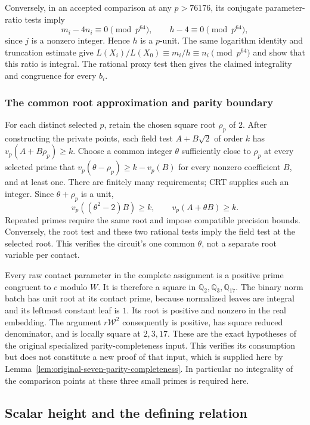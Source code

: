 \documentclass[11pt]{article}
\theoremstyle{definition}
\theoremstyle{remark}
\begin{document}
Conversely, in an accepted comparison at any $p>76176$, its conjugate
parameter-ratio tests imply
\[
 m_i-4n_i\equiv0\pmod{p^{64}},\qquad h-4\equiv0\pmod{p^{64}},
\]
since $j$ is a nonzero integer. Hence $h$ is a $p$-unit. The same
logarithm identity and truncation estimate give
$L(X_i)/L(X_0)\equiv m_i/h\equiv n_i\pmod{p^{64}}$ and show
that this ratio is integral. The rational proxy test then gives the
claimed integrality and congruence for every $b_i$.

\subsubsection{The common root approximation and parity boundary}\label{subsec:o8-root-proof}
For each distinct selected $p$, retain the chosen square root
$\rho_p$ of $2$. After constructing the private points, each field
test $A+B\sqrt2$ of order $k$ has $v_p(A+B\rho_p)\ge k$.
Choose a common integer $\theta$ sufficiently close to $\rho_p$ at
every selected prime that
$v_p(\theta-\rho_p)\ge k-v_p(B)$ for every nonzero coefficient $B$,
and at least one. There are finitely many requirements; CRT supplies
such an integer. Since $\theta+\rho_p$ is a unit,
\[
 v_p((\theta^2-2)B)\ge k,\qquad v_p(A+\theta B)\ge k.
\]
Repeated primes require the same root and impose compatible precision
bounds. Conversely, the root test and these two rational tests imply
the field test at the selected root. This verifies the circuit's one
common $\theta$, not a separate root variable per contact.

Every raw contact parameter in the complete assignment is a positive
prime congruent to $c$ modulo $W$. It is therefore a square in
$\mathbb Q_2,\mathbb Q_3,\mathbb Q_{17}$. The binary norm batch has
unit root at its contact prime, because normalized leaves are integral
and its leftmost constant leaf is $1$. Its root is positive and nonzero
in the real embedding. The argument $r\mathcal W^2$ consequently is
positive, has square reduced denominator, and is locally square at
$2,3,17$. These are the exact hypotheses of the original specialized
parity-completeness input. This verifies its consumption but does not
constitute a new proof of that input, which is supplied here by
Lemma~\ref{lem:original-seven-parity-completeness}. In particular no integrality of
the comparison points at these three small primes is required here.

\subsection{Scalar height and the defining relation}
\end{document}
